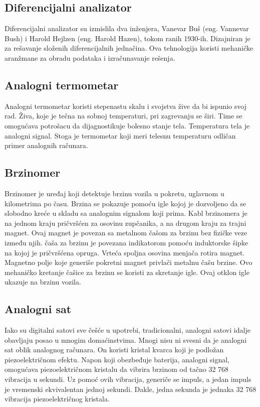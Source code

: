 \documentclass[a4paper]{article}
\begin{document}
{\subsection{Diferencijalni analizator}
\label{subsec:podnaslov3}

 Diferencijalni analizator su izmislila dva inženjera, Vanevar Buš (eng. Vannevar Bush) i Harold Hejlzen (eng. Harold Hazen), tokom ranih 1930-ih. Dizajniran je za rešavanje složenih diferencijalnih jednačina. Ova tehnologija koristi mehaničke aranžmane za obradu podataka i izračunavanje rešenja.

\subsection{Analogni termometar}
\label{subsec:podnaslov4}

Analogni termometar koristi stepenastu skalu i svojstva žive da bi ispunio svoj rad. Živa, koje je tečna na sobnoj temperaturi, pri zagrevanju se širi. Time se omogućava potrošacu da dijagnostikuje bolesno stanje tela. Temperatura tela je analogni signal. Stoga je termometar koji meri telesnu temperaturu odličan primer analognih računara. 

\subsection{Brzinomer}
\label{subsec:podnaslov5}

Brzinomer je uređaj koji detektuje brzinu vozila u pokretu, uglavnom u kilometrima po času. Brzina se pokazuje pomoću igle kojoj je dozvoljeno da se slobodno kreće u skladu sa analognim signalom koji prima. Kabl brzinomera je na jednom kraju pričvršćen za osovinu zupčanika, a na drugom kraju za trajni magnet. Ovaj magnet je povezan sa metalnom čašom za brzinu bez fizičke veze između njih. čaša za brzinu je povezana indikatorom pomoću induktorske šipke na kojoj je pričvršćena opruga. Vrteća spoljna osovina menjača rotira magnet. Magnetno polje koje generiše pokretni magnet privlači metalnu čašu brzine. Ovo mehaničko kretanje čašice za brzinu se koristi za skretanje igle. Ovaj otklon igle ukazuje na brzinu vozila.


\subsection{Analogni sat}
\label{subsec:podnaslov6}


Iako su digitalni satovi sve češće u upotrebi, tradicionalni, analogni satovi idalje obavljaju posao u mnogim domaćinstvima. Mnogi nisu ni svesni da je analogni sat oblik analognog računara. On koristi kristal kvarca koji je podložan piezoelektričnom efektu. Napon koji obezbeđuje baterija, analogni signal, omogućava piezoelektričnom kristalu da vibrira brzinom od tačno 32 768 vibracija u sekundi. Uz pomoć ovih vibracija, generiče se impuls, a jedan impuls je vremenski ekvivalentan jednoj sekundi. Dakle, jedna sekunda je jednaka 32 768 vibracija piezoelektričnog kristala.


}
\end{document}
